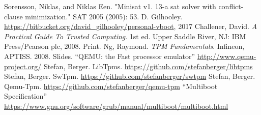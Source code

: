\documentclass[../report.tex]{subfiles}
\begin{document}
\begin{singlespace}
\begin{flushleft}
\begin{footnotesize}
\begin{thebibliography}{\kern\bibindent}
    Sorensson, Niklas, and Niklas Een. "Minisat v1. 13-a sat solver with conflict-clause minimization." SAT 2005 (2005): 53.
    D. Gilhooley. \url{https://bitbucket.org/david\_gilhooley/personal-vboot}, 2017
    Challener, David. \textit{A Practical Guide To Trusted Computing}. 1st ed. Upper Saddle River, NJ: IBM Press/Pearson plc, 2008. Print.
    Ng, Raymond. \textit{TPM Fundamentals}. Infineon, APTISS. 2008. Slides.
    ``QEMU: the Fast processor emulator'' \url{http://www.qemu-project.org/}
    Stefan, Berger. LibTpms. \url{https://github.com/stefanberger/libtpms}
    Stefan, Berger. SwTpm. \url{https://github.com/stefanberger/swtpm}
    Stefan, Berger. Qemu-Tpm. \url{https://github.com/stefanberger/qemu-tpm}
    ``Multiboot Specification'' \url{https://www.gnu.org/software/grub/manual/multiboot/multiboot.html}
\end{thebibliography}
\end{footnotesize}
\end{flushleft}
\end{singlespace}
\endgroup
\pagebreak
\end{document}

